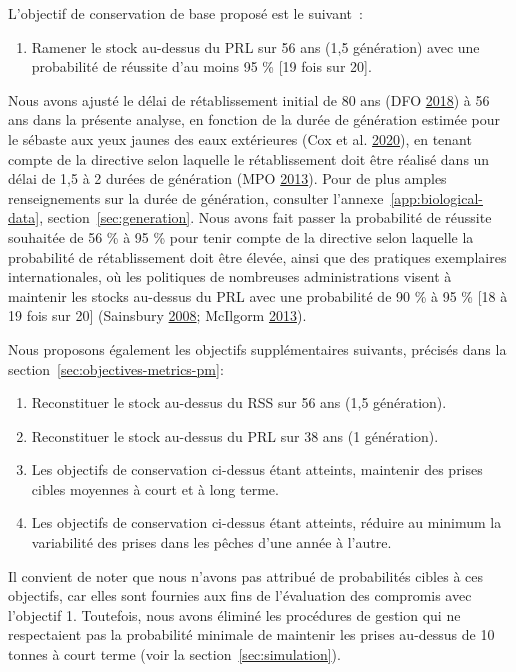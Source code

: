 \documentclass[french,11pt]{book}
\begin{document}
L'objectif de conservation de base proposé est le suivant~:
\begin{enumerate}
\def\labelenumi{\arabic{enumi}.}

\item
  Ramener le stock au-dessus du PRL sur 56 ans (1,5 génération) avec une probabilité de réussite d'au moins 95 \% {[}19 fois sur 20{]}.
\end{enumerate}
Nous avons ajusté le délai de rétablissement initial de 80 ans (DFO \protect\hyperlink{ref-ifmp2018}{2018}) à 56 ans dans la présente analyse, en fonction de la durée de génération estimée pour le sébaste aux yeux jaunes des eaux extérieures (Cox et al. \protect\hyperlink{ref-cox2020}{2020}), en tenant compte de la directive selon laquelle le rétablissement doit être réalisé dans un délai de 1,5 à 2 durées de génération (MPO \protect\hyperlink{ref-dfo2013}{2013}). Pour de plus amples renseignements sur la durée de génération, consulter l'annexe~\ref{app:biological-data}, section~\ref{sec:generation}. Nous avons fait passer la probabilité de réussite souhaitée de 56 \% à 95 \% pour tenir compte de la directive selon laquelle la probabilité de rétablissement doit être élevée, ainsi que des pratiques exemplaires internationales, où les politiques de nombreuses administrations visent à maintenir les stocks au-dessus du PRL avec une probabilité de 90 \% à 95 \% {[}18 à 19 fois sur 20{]} (Sainsbury \protect\hyperlink{ref-sainsbury2008}{2008}; McIlgorm \protect\hyperlink{ref-mcilgorm2013}{2013}).

Nous proposons également les objectifs supplémentaires suivants, précisés dans la section~\ref{sec:objectives-metrics-pm}:
\begin{enumerate}
\def\labelenumi{\arabic{enumi}.}
\setcounter{enumi}{1}
\item
  Reconstituer le stock au-dessus du RSS sur 56 ans (1,5 génération).
\item
  Reconstituer le stock au-dessus du PRL sur 38 ans (1 génération).
\item
  Les objectifs de conservation ci-dessus étant atteints, maintenir des prises cibles moyennes à court et à long terme.
\item
  Les objectifs de conservation ci-dessus étant atteints, réduire au minimum la variabilité des prises dans les pêches d'une année à l'autre.
\end{enumerate}
Il convient de noter que nous n'avons pas attribué de probabilités cibles à ces objectifs, car elles sont fournies aux fins de l'évaluation des compromis avec l'objectif 1. Toutefois, nous avons éliminé les procédures de gestion qui ne respectaient pas la probabilité minimale de maintenir les prises au-dessus de 10 tonnes à court terme (voir la section~\ref{sec:simulation}).
\end{document}
